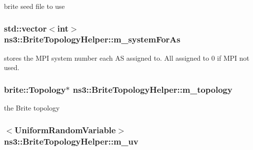 brite seed file to use 

\subsubsection[{\texorpdfstring{m\+\_\+system\+For\+As}{m_systemForAs}}]{\setlength{\rightskip}{0pt plus 5cm}std\+::vector$<$int$>$ ns3\+::\+Brite\+Topology\+Helper\+::m\+\_\+system\+For\+As\hspace{0.3cm}{\ttfamily [private]}}\hypertarget{classns3_1_1BriteTopologyHelper_aa56519675fe45e2a494346de78acd14e}{}\label{classns3_1_1BriteTopologyHelper_aa56519675fe45e2a494346de78acd14e}


stores the M\+PI system number each AS assigned to. All assigned to 0 if M\+PI not used. 

\subsubsection[{\texorpdfstring{m\+\_\+topology}{m_topology}}]{\setlength{\rightskip}{0pt plus 5cm}brite\+::\+Topology$\ast$ ns3\+::\+Brite\+Topology\+Helper\+::m\+\_\+topology\hspace{0.3cm}{\ttfamily [private]}}\hypertarget{classns3_1_1BriteTopologyHelper_a1756fddb45019b7ed9a9e3bbc0e479c6}{}\label{classns3_1_1BriteTopologyHelper_a1756fddb45019b7ed9a9e3bbc0e479c6}


the Brite topology 

\subsubsection[{\texorpdfstring{m\+\_\+uv}{m_uv}}]{$<${\bf Uniform\+Random\+Variable}$>$ ns3\+::\+Brite\+Topology\+Helper\+::m\+\_\+uv\hspace{0.3cm}{\ttfamily [private]}}\hypertarget{classns3_1_1BriteTopologyHelper_a0e2cdc4462c8e1fc2c096878cb5cdd7e}{}\label{classns3_1_1BriteTopologyHelper_a0e2cdc4462c8e1fc2c096878cb5cdd7e}


